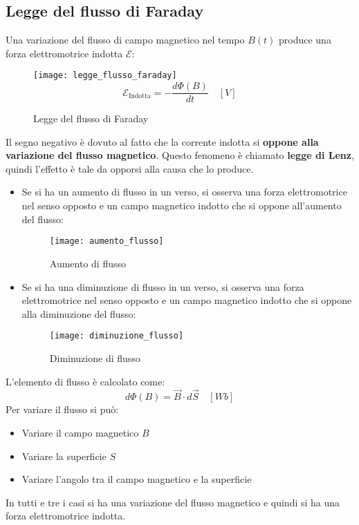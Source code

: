 \documentclass[a4paper]{article}
\begin{document}
\subsection{Legge del flusso di Faraday}
Una variazione del flusso di campo magnetico nel tempo \( B(t) \) produce una forza
elettromotrice indotta \( \mathcal{E} \):
\begin{figure}[H]
  \centering
  \texttt{[image: legge\_flusso\_faraday]}
  \[
    \mathcal{E}_{\text{Indotta}} = - \frac{d \Phi(B)}{dt} \quad \left[ V \right]
  \] 
  \caption{Legge del flusso di Faraday}
\end{figure}
\noindent
Il segno negativo è dovuto al fatto che la corrente indotta si \textbf{oppone alla variazione
del flusso magnetico}. Questo fenomeno è chiamato \textbf{legge di Lenz}, quindi
l'effetto è tale da opporsi alla causa che lo produce.

\begin{itemize}
  \item 
    Se si ha un aumento di flusso in un verso, si osserva una forza elettromotrice
    nel senso opposto e un campo magnetico indotto che si oppone all'aumento del flusso:
    \begin{figure}[H]
      \centering
      \texttt{[image: aumento\_flusso]}
      \caption{Aumento di flusso}
    \end{figure}

  \item 
    Se si ha una diminuzione di flusso in un verso, si osserva una forza elettromotrice
    nel senso opposto e un campo magnetico indotto che si oppone alla diminuzione del flusso:
    \begin{figure}[H]
      \centering
      \texttt{[image: diminuzione\_flusso]}
      \caption{Diminuzione di flusso}
    \end{figure}
\end{itemize}
L'elemento di flusso è calcolato come:
\[
  d \Phi(B) = \vec{B} \cdot d\vec{S} \quad \left[ Wb \right]
\] 
Per variare il flusso si può:
\begin{itemize}
  \item Variare il campo magnetico \( B \)
  \item Variare la superficie \( S \)
  \item Variare l'angolo tra il campo magnetico e la superficie
\end{itemize}
In tutti e tre i casi si ha una variazione del flusso magnetico e quindi si ha una forza
elettromotrice indotta.
\end{document}
